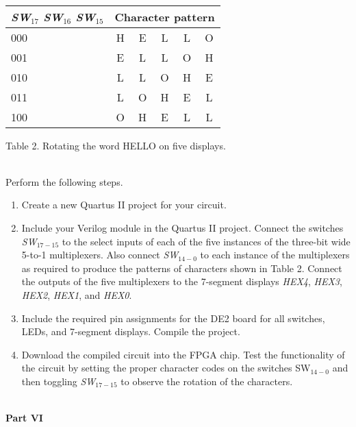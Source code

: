 \documentclass[psfig,10pt,fullpage]{article}
\begin{document}
~\\
\begin{center}
\begin{tabular}{l|ccccc}
{\it SW}$_{17}$ {\it SW}$_{16}$ {\it SW}$_{15}$ & \multicolumn{5}{c}{Character pattern} \\
\hline
\hspace{8.0 mm} {\rule[0mm]{0mm}{5mm}000} & H & E & L & L & O\\ 
\hspace{8.0 mm} 001 & E & L & L & O & H\\
\hspace{8.0 mm} 010 & L & L & O & H & E\\
\hspace{8.0 mm} 011 & L & O & H & E & L\\
\hspace{8.0 mm} 100 & O & H & E & L & L\\
\end{tabular}
\end{center}

\begin{center}
Table 2. Rotating the word HELLO on five displays.
\end{center}
~\\

Perform the following steps.
\begin{enumerate}
\item Create a new Quartus II project for your circuit.
\item Include your Verilog module in the Quartus II project. Connect the switches 
{\it SW}$_{17-15}$ to the select inputs of each of the five instances of the three-bit 
wide 5-to-1 multiplexers. Also connect {\it SW}$_{14-0}$ to each instance of the
multiplexers as required to produce the patterns of characters shown in Table 2.
Connect the outputs of the five multiplexers to the 7-segment displays {\it HEX4}, 
{\it HEX3}, {\it HEX2}, {\it HEX1}, and {\it HEX0}.
\item Include the required pin assignments for the DE2 board for all switches, LEDs, 
and 7-segment displays. Compile the project.
\item Download the compiled circuit into the FPGA chip. Test the functionality of the 
circuit by setting the proper character codes on the switches SW$_{14-0}$ and then 
toggling {\it SW}$_{17-15}$ to observe the rotation of the characters.
\end{enumerate}

~\\
\noindent
{\bf Part VI}
\end{document}
